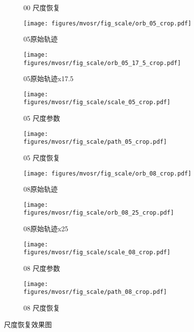 \begin{figure}
\begin{subfigure}[b]{0.23\textwidth}
                \caption{00 尺度恢复}
                \label{fig:scale_00}
                \vspace*{2mm}
                \end{subfigure}
    \begin{subfigure}[b]{0.23\textwidth}
    \texttt{[image: figures/mvosr/fig\_scale/orb\_05\_crop.pdf]}
    \label{fig:orb_path_05}
    \caption{05原始轨迹}
    \vspace*{2mm}
    \end{subfigure}
    \begin{subfigure}[b]{0.23\textwidth}
        \texttt{[image: figures/mvosr/fig\_scale/orb\_05\_17\_5\_crop.pdf]}
        \label{fig:orb_path_05_17}
        \caption{05原始轨迹x17.5}
        \vspace*{2mm}
        \end{subfigure}
        \begin{subfigure}[b]{0.23\textwidth}
            \texttt{[image: figures/mvosr/fig\_scale/scale\_05\_crop.pdf]}
            \label{fig:scale_05}
            \caption{05 尺度参数}
            \vspace*{2mm}
            \end{subfigure}
            \begin{subfigure}[b]{0.23\textwidth}
                \texttt{[image: figures/mvosr/fig\_scale/path\_05\_crop.pdf]}
                \label{fig:path_05}
                \caption{05 尺度恢复}
                \vspace*{2mm}
                \end{subfigure}
    \begin{subfigure}[b]{0.23\textwidth}
        \texttt{[image: figures/mvosr/fig\_scale/orb\_08\_crop.pdf]}
        \label{fig:orb_path_08}
        \caption{08原始轨迹}
        \end{subfigure}
        \begin{subfigure}[b]{0.23\textwidth}
            \texttt{[image: figures/mvosr/fig\_scale/orb\_08\_25\_crop.pdf]}
            \label{fig:orb_path_08_25}
            \caption{08原始轨迹x25}
            \end{subfigure}
            \begin{subfigure}[b]{0.23\textwidth}
                \texttt{[image: figures/mvosr/fig\_scale/scale\_08\_crop.pdf]}
                \label{fig:scale_08}
                \caption{08 尺度参数}
                \end{subfigure}
                \begin{subfigure}[b]{0.23\textwidth}
                    \texttt{[image: figures/mvosr/fig\_scale/path\_08\_crop.pdf]}
                    \label{fig:path_08}
                    \caption{08 尺度恢复}
                    \end{subfigure}
    \caption{尺度恢复效果图}
    {\label{fig:scale_recovery}}
    
    \end{figure}

